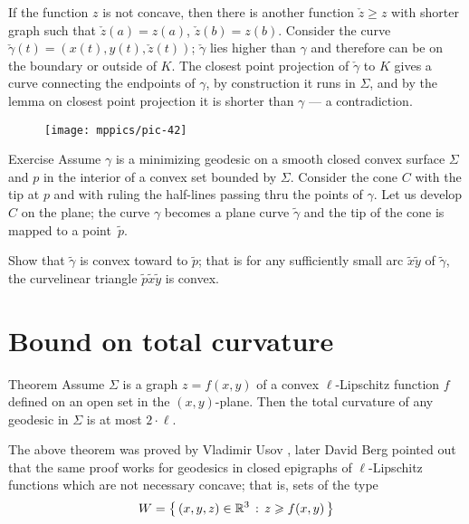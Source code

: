 If the function $z$ is not concave, then there is another function $\check z\ge z$ with shorter graph such that $\check z(a)=z(a)$, $\check z(b)=z(b)$.
Consider the curve $\check\gamma(t)=(x(t),y(t),\check z(t))$;
$\check\gamma$ lies higher than $\gamma$ and therefore can be on the boundary or outside of $K$.
The closest point projection of $\check \gamma$ to $K$ gives a curve connecting the endpoints of $\gamma$, by construction it runs in $\Sigma$, and by the lemma on closest point projection it is shorter than $\gamma$ --- a contradiction. 
\qeds

\begin{wrapfigure}{o}{30 mm}
\vskip-4mm
\centering
\texttt{[image: mppics/pic-42]}
\vskip-0mm
\end{wrapfigure}

\begin{thm}{Exercise}
Assume $\gamma$ is a minimizing geodesic on a smooth closed convex surface $\Sigma$ and $p$ in the interior of a convex set bounded by $\Sigma$.
Consider the cone $C$ with the tip at $p$ and with ruling the half-lines passing thru the points of $\gamma$.
Let us develop $C$ on the plane; the curve $\gamma$ becomes a plane curve $\tilde\gamma$ and the tip of the cone is mapped to a point~$\tilde p$.

Show that $\tilde\gamma$ is convex toward to $\tilde p$; that is for any sufficiently small arc $\tilde x\tilde y$ of $\tilde\gamma$, the curvelinear triangle $\tilde p\tilde x\tilde y$ is convex. 
\end{thm}



\section{Bound on total curvature}




\begin{thm}{Theorem}\label{thm:usov}
Assume $\Sigma$ is a graph $z=f(x,y)$ of a convex $\ell$-Lipschitz function $f$ defined on an open set in the $(x,y)$-plane.
Then the total curvature of any geodesic in $\Sigma$ is at most $2\cdot \ell$.
\end{thm}

The above theorem was proved by Vladimir Usov \cite{usov},
later David Berg \cite{berg} pointed out that the same proof works for geodesics in closed epigraphs of $\ell$-Lipschitz functions which are not necessary concave; that is, sets of the type 
\[W=\left\{\,{(x,y,z)\in\mathbb{R}^3}\,:\,{z\geqslant f(x,y)}\,\right\}\]


